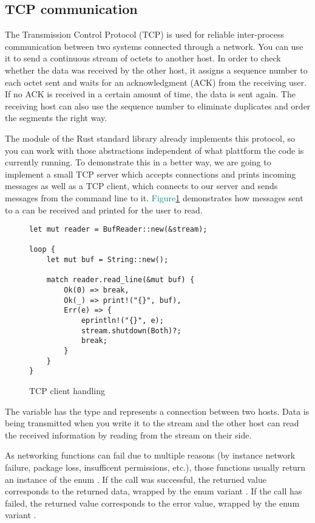\subsection{TCP communication}
The Transmission Control Protocol (TCP) is used for reliable inter-process communication between two systems connected
through a network. You can use it to send a continuous stream of octets to another host. In order to check whether the
data was received by the other host, it assigns a sequence number to each octet sent and waits for an acknowledgment
(ACK) from the receiving user. If no ACK is received in a certain amount of time, the data is sent again. The receiving
host can also use the sequence number to eliminate duplicates and order the segments the right way. \cite{RFC0793}

The module  of the Rust standard library already implements this protocol, so you can work with those
abstractions independent of what plattform the code is currently running. To demonstrate this in a better way, we are
going to implement a small TCP server which accepts connections and prints incoming messages as well as a TCP client,
which connects to our server and sends messages from the command line to it.
\textcolor{teal}{Figure\ref{tcp-client-handeling}} demonstrates how messages sent to a  can
be received and printed for the user to read.

\begin{figure}[ht]
    \begin{verbatim}
let mut reader = BufReader::new(&stream);

loop {
    let mut buf = String::new();

    match reader.read_line(&mut buf) {
        Ok(0) => break,
        Ok(_) => print!("{}", buf),
        Err(e) => {
            eprintln!("{}", e);
            stream.shutdown(Both)?;
            break;
        }
    }
}
    \end{verbatim}
    \caption{TCP client handling}
    \label{tcp-client-handeling}
\end{figure}

The variable  has the type  and represents a connection between two hosts. Data is being
transmitted when you write it to the stream and the other host can read the received information by reading from the
stream on their side.

As networking functions can fail due to multiple reasons (by instance network failure, package loss, insufficent
permissions, etc.), those functions usually return an instance of the enum . If the call was
successful, the returned value corresponds to the returned data, wrapped by the enum variant . If the call
has failed, the returned value corresponds to the error value, wrapped by the enum variant .

